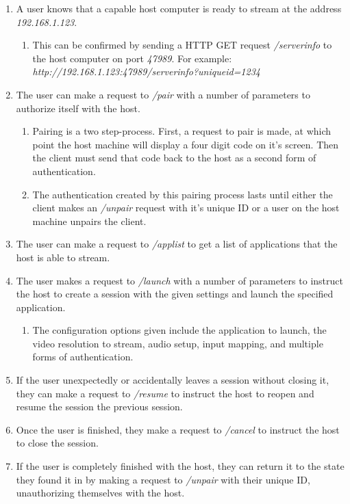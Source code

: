 \begin{enumerate}
  \item A user knows that a capable host computer is ready to stream at the address \emph{192.168.1.123}.
        \begin{enumerate}
          \item This can be confirmed by sending a HTTP GET request \emph{/serverinfo} to the host computer on port \emph{47989}. For example: \newline\emph{http://192.168.1.123:47989/serverinfo?uniqueid=1234}
        \end{enumerate}
  \item The user can make a request to \emph{/pair} with a number of parameters to authorize itself with the host.
        \begin{enumerate}
          \item Pairing is a two step-process.
                First, a request to pair is made, at which point the host machine will display a four digit code on it's screen.
                Then the client must send that code back to the host as a second form of authentication.
          \item The authentication created by this pairing process lasts until either the client makes an \emph{/unpair} request with it's unique ID or a user on the host machine unpairs the client.
        \end{enumerate}
  \item The user can make a request to \emph{/applist} to get a list of applications that the host is able to stream.
  \item The user makes a request to \emph{/launch} with a number of parameters to instruct the host to create a session with the given settings and launch the specified application.
        \begin{enumerate}
          \item The configuration options given include the application to launch, the video resolution to stream, audio setup, input mapping, and multiple forms of authentication.
        \end{enumerate}
  \item If the user unexpectedly or accidentally leaves a session without closing it, they can make a request to \emph{/resume} to instruct the host to reopen and resume the session the previous session.
  \item Once the user is finished, they make a request to \emph{/cancel} to instruct the host to close the session.
  \item If the user is completely finished with the host, they can return it to the state they found it in by making a request to \emph{/unpair} with their unique ID, unauthorizing themselves with the host.
\end{enumerate}


